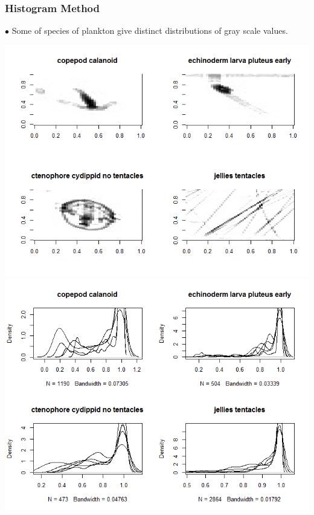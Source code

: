 \documentclass{beamer}
\begin{document}
\begin{frame}
\frametitle{Histogram Method}
$\bullet$ Some of species of plankton give distinct distributions of gray scale values. 
\begin{center}
	\includegraphics[scale=0.23]{images.png}
	\includegraphics[scale=0.23]{grayscale.png}
\end{center}
\end{frame}
\end{document}
